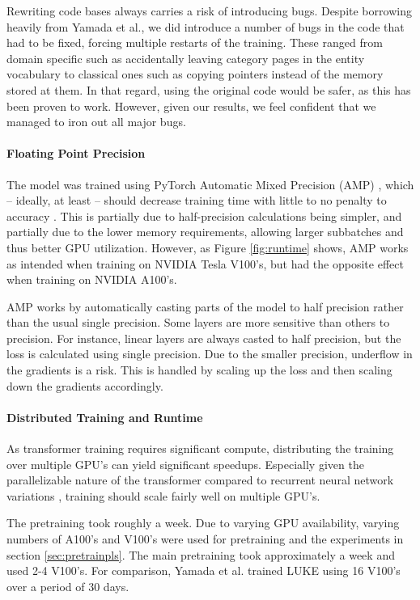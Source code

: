 \documentclass[main.tex]{subfiles}
\begin{document}
Rewriting code bases always carries a risk of introducing bugs.
Despite borrowing heavily from Yamada et al., we did introduce a number of bugs in the code that had to be fixed, forcing multiple restarts of the training.
These ranged from domain specific such as accidentally leaving category pages in the entity vocabulary to classical ones such as copying pointers instead of the memory stored at them.
In that regard, using the original code would be safer, as this has been proven to work.
However, given our results, we feel confident that we managed to iron out all major bugs.

\paragraph{Floating Point Precision}
The model was trained using PyTorch Automatic Mixed Precision (AMP) \cite{pytorchamp}, which -- ideally, at least -- should decrease training time with little to no penalty to accuracy \cite{huang2020amp}.
This is partially due to half-precision calculations being simpler, and partially due to the lower memory requirements, allowing larger subbatches and thus better GPU utilization.
However, as Figure \ref{fig:runtime} shows, AMP works as intended when training on NVIDIA Tesla V100's, but had the opposite effect when training on NVIDIA A100's.

AMP works by automatically casting parts of the model to half precision rather than the usual single precision.
Some layers are more sensitive than others to precision.
For instance, linear layers are always casted to half precision, but the loss is calculated using single precision.
Due to the smaller precision, underflow in the gradients is a risk.
This is handled by scaling up the loss and then scaling down the gradients accordingly.
\cite{pytorchamp}

\paragraph{Distributed Training and Runtime}
As transformer training requires significant compute, distributing the training over multiple GPU's can yield significant speedups.
Especially given the parallelizable nature of the transformer compared to recurrent neural network variations \cite{vaswani2017att}, training should scale fairly well on multiple GPU's.

The pretraining took roughly a week.
Due to varying GPU availability, varying numbers of A100's and V100's were used for pretraining and the experiments in section \ref{sec:pretrainpls}.
The main pretraining took approximately a week and used 2-4 V100's.
For comparison, Yamada et al. trained LUKE using 16 V100's over a period of 30 days. \cite{yamada2020luke}
\end{document}
